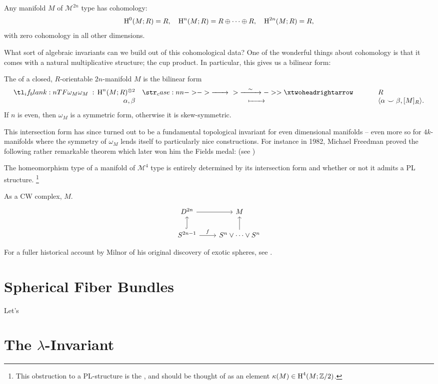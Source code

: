 \begin{proposition}
Any manifold $M$ of $\mathscr{M}^{2n}$ type has cohomology:
\[
  \operatorname{H}^0(M; R) = R,\quad \operatorname{H}^n(M; R) = R\oplus \cdots \oplus R,\quad \operatorname{H}^{2n}(M; R)=R,
\]
with zero cohomology in all other dimensions. 
\end{proposition}

What sort of algebraic invariants can we build out of this cohomological data? One of the wonderful things about cohomology is that it comes with a natural multiplicative structure; the cup product. In particular, this gives us a bilinear form:
\begin{definition}\label{def:intersection-form}
  The  of a closed, $R$-orientable $2n$-manifold $M$ is the bilinear form
\[
  \lkxfunc{\omega_M}{\H^n(M;R)^{\otimes 2}}{R}{\alpha, \beta}{\langle\alpha\smile\beta, [M]_R\rangle.}
\]
If $n$ is even, then $\omega_M$ is a symmetric form, otherwise it is skew-symmetric. 
\end{definition}
This intersection form has since turned out to be a fundamental topological invariant for even dimensional manifolds -- even more so for $4k$-manifolds where the symmetry of $\omega_M$ lends itself to particularly nice constructions. For instance in 1982, Michael Freedman proved the following rather remarkable theorem which later won him the Fields medal: (see \cite{freedman1982})

\begin{theorem}
  The homeomorphism type of a manifold of $\mathscr{M}^4$ type is entirely determined by its intersection form and whether or not it admits a PL structure.
  \footnote{This obstruction to a PL-structure is the , and should be thought of as an element $\kappa(M)\in \operatorname{H}^4(M;\mathbb{Z}/2)$. }
\end{theorem}


As a CW complex, $M$.
\[\begin{tikzcd}
	{D^{2n}} & M \\
	{S^{2n-1}} & {S^n\vee\cdots\vee S^n}
	\arrow[from=1-1, to=1-2]
	\arrow[hook, from=2-1, to=1-1]
	\arrow["f", from=2-1, to=2-2]
	\arrow[from=2-2, to=1-2]
\end{tikzcd}\]

For a fuller historical account by Milnor of his original discovery of exotic spheres, see \cite{milnor2000exotic}.

\section{Spherical Fiber Bundles}

Let's 

\section{The \texorpdfstring{$\lambda$}{λ}-Invariant}

